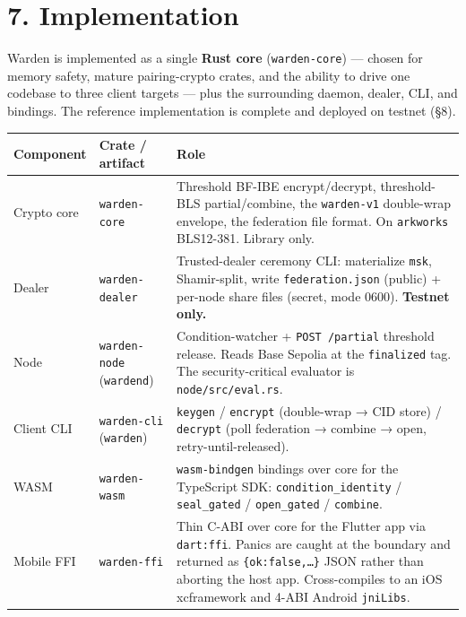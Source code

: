 \documentclass[
  11pt,
]{article}
\begin{document}
\section{7. Implementation}\label{implementation}

Warden is implemented as a single \textbf{Rust core}
(\texttt{warden-core}) --- chosen for memory safety, mature
pairing-crypto crates, and the ability to drive one codebase to three
client targets --- plus the surrounding daemon, dealer, CLI, and
bindings. The reference implementation is complete and deployed on
testnet (§8).

\begin{longtable}[]{@{}
  >{\raggedright\arraybackslash}p{}
  >{\raggedright\arraybackslash}p{}
  >{\raggedright\arraybackslash}p{}@{}}
\toprule\noalign{}
\begin{minipage}[b]{\linewidth}\raggedright
Component
\end{minipage} & \begin{minipage}[b]{\linewidth}\raggedright
Crate / artifact
\end{minipage} & \begin{minipage}[b]{\linewidth}\raggedright
Role
\end{minipage} \\
\midrule\noalign{}
\endhead
\bottomrule\noalign{}
\endlastfoot
Crypto core & \texttt{warden-core} & Threshold BF-IBE encrypt/decrypt,
threshold-BLS partial/combine, the \texttt{warden-v1} double-wrap
envelope, the federation file format. On \texttt{arkworks} BLS12-381.
Library only. \\
Dealer & \texttt{warden-dealer} & Trusted-dealer ceremony CLI:
materialize \texttt{msk}, Shamir-split, write \texttt{federation.json}
(public) + per-node share files (secret, mode 0600). \textbf{Testnet
only.} \\
Node & \texttt{warden-node} (\texttt{wardend}) & Condition-watcher +
\texttt{POST\ /partial} threshold release. Reads Base Sepolia at the
\texttt{finalized} tag. The security-critical evaluator is
\texttt{node/src/eval.rs}. \\
Client CLI & \texttt{warden-cli} (\texttt{warden}) & \texttt{keygen} /
\texttt{encrypt} (double-wrap → CID store) / \texttt{decrypt} (poll
federation → combine → open, retry-until-released). \\
WASM & \texttt{warden-wasm} & \texttt{wasm-bindgen} bindings over core
for the TypeScript SDK: \texttt{condition\_identity} /
\texttt{seal\_gated} / \texttt{open\_gated} / \texttt{combine}. \\
Mobile FFI & \texttt{warden-ffi} & Thin C-ABI over core for the Flutter
app via \texttt{dart:ffi}. Panics are caught at the boundary and
returned as \texttt{\{ok:false,…\}} JSON rather than aborting the host
app. Cross-compiles to an iOS xcframework and 4-ABI Android
\texttt{jniLibs}. \\
\end{longtable}
\end{document}
